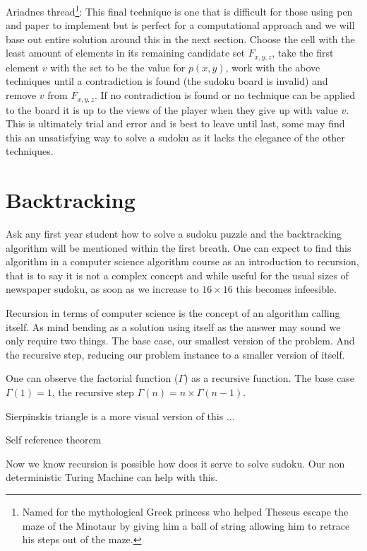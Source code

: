 \documentclass[a4paper,11pt]{report}
\begin{document}
Ariadnes thread\footnote{Named for the mythological Greek princess who helped Theseus escape the maze of the Minotaur by giving him a ball of string allowing him to retrace his steps out of the maze.}: This final technique is one that is difficult for those using pen and paper to implement but is perfect for a computational approach and we will base out entire solution around this in the next section. Choose the cell with the least amount of elements in its remaining candidate set $F_{x,y,z}$, take the first element $v$ with the set to be the value for $p(x,y)$, work with the above techniques until a contradiction is found (the sudoku board is invalid) and remove $v$ from $F_{x,y,z}$. If no contradiction is found or no technique can be applied to the board it is up to the views of the player when they give up with value $v$. This is ultimately trial and error and is best to leave until last, some may find this an unsatisfying way to solve a sudoku as it lacks the elegance of the other techniques. 


\section{Backtracking}
Ask any first year student how to solve a sudoku puzzle and the backtracking algorithm will be mentioned within the first breath. One can expect to find this algorithm in a computer science algorithm course as an introduction to recursion, that is to say it is not a complex concept and while useful for the usual sizes of newspaper sudoku, as soon as we increase to $16 \times 16$ this becomes infeesible.

Recursion in terms of computer science is the concept of an algorithm calling itself. As mind bending as a solution using itself as the answer may sound we only require two  things. The base case, our smallest version of the problem. And the recursive step, reducing our problem instance to a smaller version of itself. 

One can observe the factorial function ($\Gamma$) as a recursive function. The base case $\Gamma(1)=1$, the recursive step $\Gamma(n)=n\times \Gamma(n-1)$.

Sierpinskis triangle is a more visual version of this ...

Self reference theorem 

Now we know recursion is possible how does it serve to solve sudoku. Our non deterministic Turing Machine can help with this.
\end{document}
